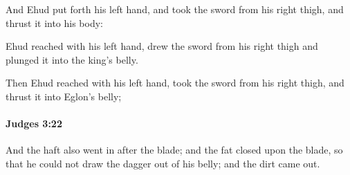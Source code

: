 			\begin{versebox}
					\item[BHS] 
					\item[ASV] And Ehud put forth his left hand, and took the sword from his right thigh, and thrust it into his body:
					\item[NIV] Ehud reached with his left hand, drew the sword from his right thigh and plunged it into the king’s belly.
					\item[NRSV] Then Ehud reached with his left hand, took the sword from his right thigh, and thrust it into Eglon’s belly;
			\end{versebox}

		\paragraph{Judges 3:22} %
			\label{JUDGES-3-22}

			And the haft also went in after the blade; and the fat closed upon the blade, so that he could not draw the dagger out of his belly; and the dirt came out.

